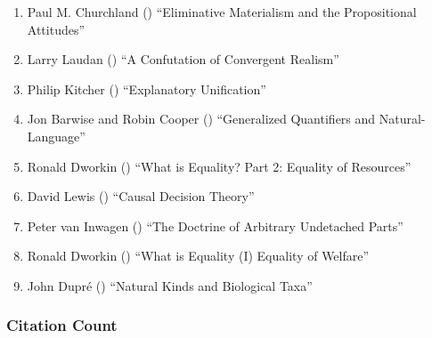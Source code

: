 \documentclass[
  10pt,
  letterpaper,
  DIV=11,
  numbers=noendperiod,
  twoside]{scrartcl}
\providecommand{\tightlist}{%
  \setlength{\itemsep}{0pt}\setlength{\parskip}{0pt}}\usepackage{longtable,booktabs,array}
\begin{document}
\begin{enumerate}
\def\labelenumi{\arabic{enumi}.}
\tightlist
\item
  Paul M. Churchland ()
  ``Eliminative Materialism and the Propositional Attitudes''
\item
  Larry Laudan () ``A Confutation
  of Convergent Realism''
\item
  Philip Kitcher () ``Explanatory
  Unification''
\item
  Jon Barwise and Robin Cooper ()
  ``Generalized Quantifiers and Natural-Language''
\item
  Ronald Dworkin () ``What is
  Equality? Part 2: Equality of Resources''
\item
  David Lewis () ``Causal
  Decision Theory''
\item
  Peter van Inwagen () ``The
  Doctrine of Arbitrary Undetached Parts''
\item
  Ronald Dworkin () ``What is
  Equality (I) Equality of Welfare''
\item
  John Dupré () ``Natural Kinds
  and Biological Taxa''
\end{enumerate}

\subsubsection*{Citation Count}\label{sec-count-1981}
\end{document}
